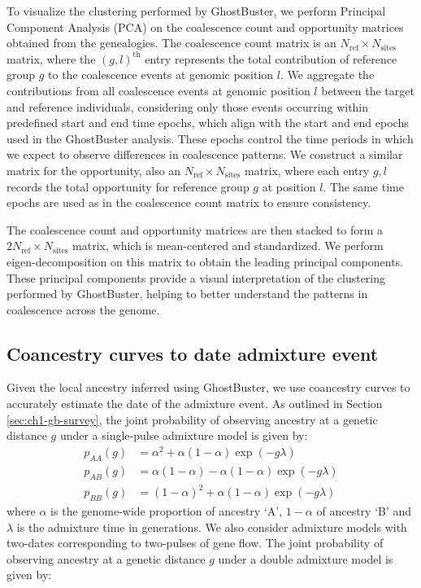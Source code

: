 To visualize the clustering performed by GhostBuster, we perform Principal Component Analysis (PCA) on the coalescence count and opportunity matrices obtained from the genealogies. The coalescence count matrix is an $N_{\text{ref}} \times N_{\text{sites}}$ matrix, where the $(g, l)^{\text{th}}$ entry represents the total contribution of reference group $g$ to the coalescence events at genomic position $l$. We aggregate the contributions from all coalescence events at genomic position $l$ between the target and reference individuals, considering only those events occurring within predefined start and end time epochs, which align with the start and end epochs used in the GhostBuster analysis. These epochs control the time periods in which we expect to observe differences in coalescence patterns. We construct a similar matrix for the opportunity, also an $N_{\text{ref}} \times N_{\text{sites}}$ matrix, where each entry $g,l$ records the total opportunity for reference group $g$ at position $l$. The same time epochs are used as in the coalescence count matrix to ensure consistency.

The coalescence count and opportunity matrices are then stacked to form a $2N_{\text{ref}} \times N_{\text{sites}}$ matrix, which is mean-centered and standardized. We perform eigen-decomposition on this matrix to obtain the leading principal components. These principal components provide a visual interpretation of the clustering performed by GhostBuster, helping to better understand the patterns in coalescence across the genome.

\subsection{Coancestry curves to date admixture event}
\label{sec:ch2-gb-coancestry}

Given the local ancestry inferred using GhostBuster, we use coancestry curves to accurately estimate the date of the admixture event.
%
As outlined in Section \ref{sec:ch1-gb-survey}, the joint probability of observing ancestry at a genetic distance \( g \) under a single-pulse admixture model is given by:
\begin{align}
    p_{AA}(g) &= \alpha^2 + \alpha (1 - \alpha) \exp(-g \lambda) \nonumber \\
    p_{AB}(g) &= \alpha (1 - \alpha) - \alpha (1 - \alpha) \exp(-g \lambda) \nonumber \\
    p_{BB}(g) &= (1-\alpha)^2 + \alpha (1 - \alpha) \exp(-g \lambda)
\end{align}
where $\alpha$ is the genome-wide proportion of ancestry `A', $1-\alpha$ of ancestry `B' and $\lambda$ is the admixture time in generations. We also consider admixture models with two-dates corresponding to two-pulses of gene flow. The joint probability of observing ancestry at a genetic distance \( g \) under a double admixture model is given by:

